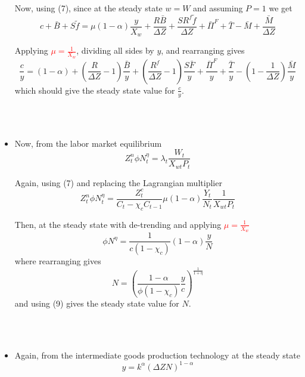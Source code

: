 \documentclass[11pt,titlepage]{article}
\begin{document}
\begin{itemize}
Now, using (7), since at the steady state $w=W$ and assuming $P=1$ we get
\begin{equation*}
c + \bar{B} + S \tilde{f} = \mu(1-\alpha) \frac{y}{X_{w}} + \frac{R \bar{B}}{\Delta Z} + \frac{SR^{f} \tilde{f}}{\Delta Z} + \bar{\Pi}^{F} + \bar{T} - \bar{M} + \frac{\bar{M}}{\Delta Z}
\end{equation*}

Applying \textcolor{red}{$\mu=\frac{1}{X_{w}}$}, dividing all sides by $y$, and rearranging gives
\begin{equation}
\frac{c}{y} = (1-\alpha) + \left(\frac{R}{\Delta Z}-1\right)\frac{\bar{B}}{y} + \left(\frac{R^{f}}{\Delta Z}-1\right)\frac{S\bar{F}}{y} + \frac{\bar{\Pi}^{F}}{y} + \frac{\bar{T}}{y} - \left(1-\frac{1}{\Delta Z}\right)\frac{\bar{M}}{y}
\end{equation}
which should give the steady state value for $\frac{c}{y}$.

~\\~

\item Now, from the labor market equilibrium
\begin{equation*}
Z_{t}^{n}\phi N_{t}^{\eta} = \lambda_{t} \frac{W_{t}}{X_{wt} P_{t}}
\end{equation*}

Again, using (7) and replacing the Lagrangian multiplier
\begin{equation*}
Z_{t}^{n}\phi N_{t}^{\eta} = \frac{Z_{t}^{c}}{C_{t}-\chi_{c}C_{t-1}} \mu(1-\alpha)\frac{Y_{t}}{N_{t}} \frac{1}{X_{wt} P_{t}}
\end{equation*}

Then, at the steady state with de-trending and applying \textcolor{red}{$\mu=\frac{1}{X_{w}}$}
\begin{equation*}
\phi N^{\eta} = \frac{1}{c\left(1-\chi_{c}\right)} (1-\alpha)\frac{y}{N}
\end{equation*}
where rearranging gives
\begin{equation}
N = \left(\frac{1-\alpha}{\phi\left(1-\chi_{c}\right)}\frac{y}{c}\right)^{\frac{1}{1+\eta}}
\end{equation}
and using (9) gives the steady state value for $N$.

~\\~

\item Again, from the intermediate goods production technology at the steady state
\begin{equation*}
y = k^\alpha \left(\Delta Z N\right)^{1-\alpha}
\end{equation*}


\end{itemize}
\end{document}
